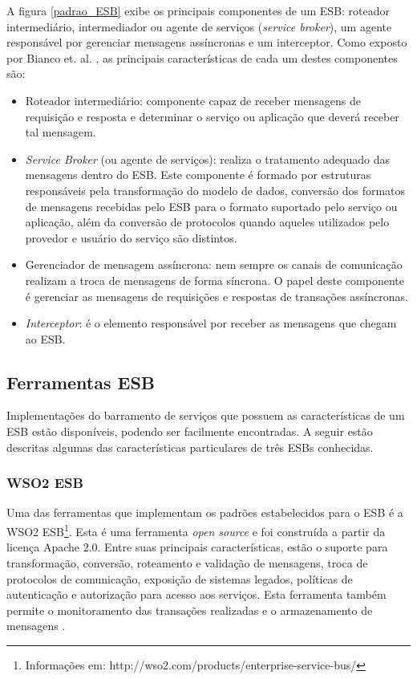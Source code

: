 A figura \ref{padrao_ESB} exibe os principais componentes de um ESB: roteador intermediário, intermediador ou agente de serviços (\textit{service broker}), um agente responsável por gerenciar mensagens assíncronas e um interceptor. Como exposto por Bianco et. al. \cite{bianco_architecting_2011}, as principais características de cada um destes componentes são:

\begin{itemize}

\item Roteador intermediário: componente capaz de receber mensagens de requisição e resposta e determinar o serviço ou aplicação que deverá receber tal mensagem.

\item \textit{Service Broker} (ou agente de serviços): realiza o tratamento adequado das mensagens dentro do ESB. Este componente é formado por estruturas responsáveis pela transformação do modelo de dados, conversão dos formatos de mensagens recebidas pelo ESB para o formato suportado pelo serviço ou aplicação, além da conversão de protocolos quando aqueles utilizados pelo provedor e usuário do serviço são distintos.

\item Gerenciador de mensagem assíncrona: nem sempre os canais de comunicação realizam a troca de mensagens de forma síncrona. O papel deste componente é gerenciar as mensagens de requisições e respostas de transações assíncronas.

\item \textit{Interceptor}: é o elemento responsável por receber as mensagens que chegam ao ESB.
\end{itemize}

\subsection{Ferramentas ESB}

Implementações do barramento de serviços que possuem as características de um ESB estão disponíveis, podendo ser facilmente encontradas. A seguir estão descritas algumas das características particulares de três ESBs conhecidas.

\subsubsection{WSO2 ESB}
Uma das ferramentas que implementam os padrões estabelecidos para o ESB é a WSO2 ESB\footnote{Informações em: http://wso2.com/products/enterprise-service-bus/}. Esta é uma ferramenta \textit{open source} e foi construída a partir da licença Apache 2.0. Entre suas principais características, estão o suporte para transformação, conversão, roteamento e validação de mensagens, troca de protocolos de comunicação, exposição de sistemas legados, políticas de autenticação e autorização para acesso aos serviços. Esta ferramenta também permite o monitoramento das transações realizadas e o armazenamento de mensagens \cite{siriwardena_enterprise_2013}.

